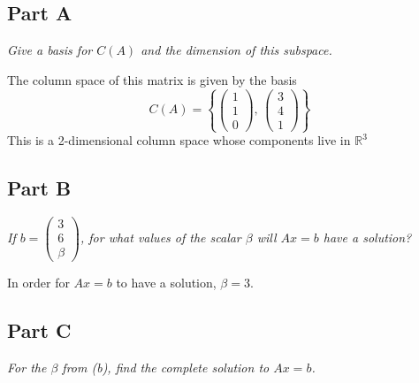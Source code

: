 \documentclass{article}
\begin{document}
\subsection*{Part A}

\textit{Give a basis for $C(A)$ and the dimension of this subspace.}

\bigbreak

The column space of this matrix is given by the basis
$$ C(A) = \left\{ \begin{pmatrix}
    1 \\
    1 \\
    0
\end{pmatrix},\, \begin{pmatrix}
    3 \\
    4 \\
    1
\end{pmatrix} \right\} $$
This is a 2-dimensional column space whose components live in $ \mathbb{R}^3 $

\subsection*{Part B}

\textit{If $b = \begin{pmatrix} 3 \\ 6 \\ \beta \end{pmatrix}$, for what
values of the scalar $\beta$ will $Ax=b$ have a solution?}

\bigbreak

In order for $ Ax = b $ to have a solution, $ \beta = 3 $.

\subsection*{Part C}

\textit{For the $\beta$ from (b), find the complete solution to $Ax=b$.}

\bigbreak
\end{document}
